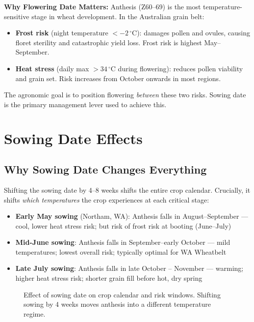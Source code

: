 \begin{keyconceptbox}
\textbf{Why Flowering Date Matters:}
Anthesis (Z60--69) is the most temperature-sensitive stage in wheat development. In the Australian grain belt:
\begin{itemize}
  \item \textbf{Frost risk} (night temperature $<-2\,^\circ$C): damages pollen and ovules, causing floret sterility and catastrophic yield loss. Frost risk is highest May--September.
  \item \textbf{Heat stress} (daily max $>34\,^\circ$C during flowering): reduces pollen viability and grain set. Risk increases from October onwards in most regions.
\end{itemize}
The agronomic goal is to position flowering \emph{between} these two risks. Sowing date is the primary management lever used to achieve this.
\end{keyconceptbox}

\section{Sowing Date Effects}

\subsection{Why Sowing Date Changes Everything}

Shifting the sowing date by 4--8 weeks shifts the entire crop calendar. Crucially, it shifts \emph{which temperatures} the crop experiences at each critical stage:

\begin{itemize}
  \item \textbf{Early May sowing} (Northam, WA): Anthesis falls in August--September — cool, lower heat stress risk; but risk of frost risk at booting (June--July)
  \item \textbf{Mid-June sowing}: Anthesis falls in September--early October — mild temperatures; lowest overall risk; typically optimal for WA Wheatbelt
  \item \textbf{Late July sowing}: Anthesis falls in late October -- November — warming; higher heat stress risk; shorter grain fill before hot, dry spring
\end{itemize}

\begin{figure}[H]
  \centering
  \caption{Effect of sowing date on crop calendar and risk windows. Shifting sowing by 4 weeks moves anthesis into a different temperature regime.}
  \label{fig:sowing-date-timeline}
\end{figure}

